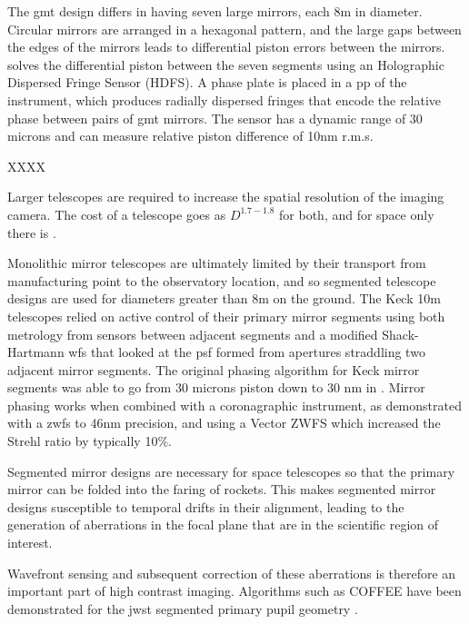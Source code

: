 \documentclass[letterpaper]{ar-1col}
\begin{document}
The \ac{gmt} design differs in having seven large mirrors, each 8m in diameter.
%
Circular mirrors are arranged in a hexagonal pattern, and the large gaps between the edges of the mirrors leads to differential piston errors between the mirrors.
%
\citet{Haffert22,Quiros-Pacheco22} solves the differential piston between the seven segments using an Holographic Dispersed Fringe Sensor (HDFS).
%
A phase plate is placed in a \ac{pp} of the instrument, which produces radially dispersed fringes that encode the relative phase between pairs of \ac{gmt} mirrors.
%
The sensor has a dynamic range of 30 microns and can measure relative piston difference of 10nm r.m.s.


XXXX


Larger telescopes are required to increase the spatial resolution of the imaging camera. The cost of a telescope goes as $D^{1.7-1.8}$ \citep{Stahl20} for both, and for space only there is \citet{Stahl10}.
 
Monolithic mirror telescopes are ultimately limited by their transport from manufacturing point to the observatory location, and so segmented telescope designs are used for diameters greater than 8m on the ground.
The Keck 10m telescopes relied on active control of their primary mirror segments using both metrology from sensors between adjacent segments and a modified Shack-Hartmann \ac{wfs} that looked at the \ac{psf} formed from apertures straddling two adjacent mirror segments.
%
The original phasing algorithm for Keck mirror segments was able to go from 30 microns piston down to 30 nm in \citet{Chanan98,Chanan00}.
%
Mirror phasing works when combined with a coronagraphic instrument, as \citep{vanKooten22} demonstrated with a \ac{zwfs} to 46nm precision, and \citep{Salama24} using a Vector ZWFS which increased the Strehl ratio by typically 10\%.

Segmented mirror designs are necessary for space telescopes so that the primary mirror can be folded into the faring of rockets.
%
%
This makes segmented mirror designs susceptible to temporal drifts in their alignment, leading to the generation of aberrations in the focal plane that are in the scientific region of interest.

Wavefront sensing and subsequent correction of these aberrations is therefore an important part of high contrast imaging.
%
Algorithms such as COFFEE have been demonstrated for the \ac{jwst} segmented primary pupil geometry \citep{Leboulleux20}.
\end{document}
